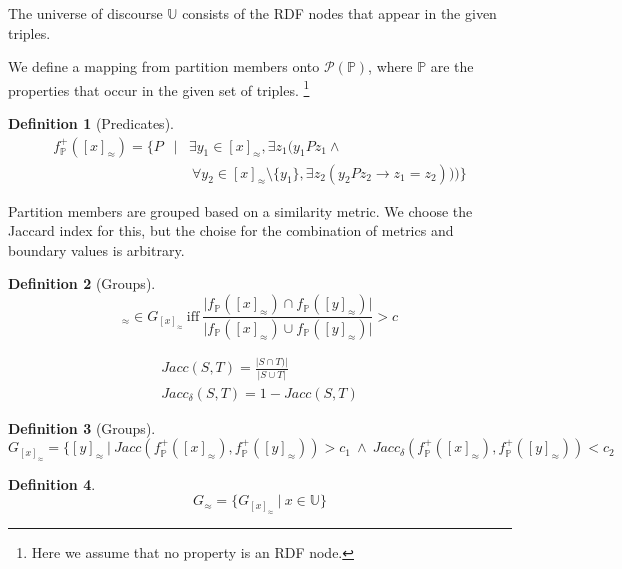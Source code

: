 \documentclass[11pt,a4paper,notitlepage,onecolumn,twoside]{article}
\newtheorem{definition}{Definition}
\begin{document}
The universe of discourse $\mathbb{U}$ consists of the RDF nodes that appear
in the given triples.

We define a mapping from partition members onto $\mathcal{P}(\mathbb{P})$,
where $\mathbb{P}$ are the properties that occur in the given set of triples.
\footnote{Here we assume that no property is an RDF node.}

\begin{definition}[Predicates]
\begin{eqnarray}
f^{+}_{\mathbb{P}}([x]_{\approx}) = \{ P &\vert&
    \exists y_1 \in [x]_{\approx}, \exists z_1 (y_1Pz_1 \land \\
    & & \  \forall y_2 \in [x]_{\approx} \setminus \{ y_1 \},
    \exists z_2 (y_2Pz_2 \rightarrow z_1 = z_2))) \} \nonumber
\end{eqnarray}
\end{definition}

Partition members are grouped based on a similarity metric.
We choose the Jaccard index for this, but the choise for the combination
of metrics and boundary values is arbitrary.

\begin{definition}[Groups]
\begin{equation}
[y]_{\approx} \in G_{[x]_{\approx}} \  \text{iff} \ 
\frac{\vert f_{\mathbb{P}}([x]_{\approx}) \cap f_{\mathbb{P}}([y]_{\approx}) \vert}
     {\vert f_{\mathbb{P}}([x]_{\approx}) \cup f_{\mathbb{P}}([y]_{\approx}) \vert}
     > c
\end{equation}
\end{definition}

\begin{align}
Jacc(S, T) = \frac{\vert S \cap T) \vert}{\vert S \cup T \vert} \\
Jacc_{\delta}(S, T) = 1 - Jacc(S, T)
\end{align}

\begin{definition}[Groups]
\begin{equation}
G_{[x]_{\approx}} = \{ [y]_{\approx} \  \vert \ 
  Jacc(f^{+}_{\mathbb{P}}([x]_{\approx}), f^{+}_{\mathbb{P}}([y]_{\approx})) > c_1
  \  \land \ 
  Jacc_{\delta}(f^{+}_{\mathbb{P}}([x]_{\approx}), f^{+}_{\mathbb{P}}([y]_{\approx})) < c_2
\end{equation}
\end{definition}

\begin{definition}
\begin{equation}
G_{\approx} = \{ G_{[x]_{\approx}} \  \vert \  x \in \mathbb{U} \}
\end{equation}
\end{definition}
\end{document}
